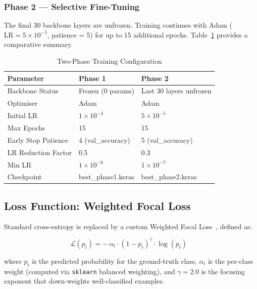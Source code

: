 \documentclass[12pt, a4paper, onecolumn]{IEEEtran}
\begin{document}
\subsubsection{Phase 2 --- Selective Fine-Tuning}

The final 30 backbone layers are unfrozen. Training continues with Adam ($\text{LR} = 5\times10^{-5}$,
patience = 5) for up to 15 additional epochs. Table~\ref{tab:phases} provides a comparative summary.

\begin{table}[H]
  \centering
  \caption{Two-Phase Training Configuration}
  \label{tab:phases}
  \begin{tabularx}{\linewidth}{lXX}
    \toprule
    \textbf{Parameter}      & \textbf{Phase 1} & \textbf{Phase 2} \\
    \midrule
    Backbone Status         & Frozen (0 params)     & Last 30 layers unfrozen \\
    Optimiser               & Adam                  & Adam \\
    Initial LR              & $1\times10^{-3}$      & $5\times10^{-5}$ \\
    Max Epochs              & 15                    & 15 \\
    Early Stop Patience     & 4 (val\_accuracy)     & 5 (val\_accuracy) \\
    LR Reduction Factor     & 0.5                   & 0.3 \\
    Min LR                  & $1\times10^{-6}$      & $1\times10^{-7}$ \\
    Checkpoint              & best\_phase1.keras    & best\_phase2.keras \\
    \bottomrule
  \end{tabularx}
\end{table}

\subsection{Loss Function: Weighted Focal Loss}

Standard cross-entropy is replaced by a custom Weighted Focal Loss~\cite{lin2017}, defined as:

\begin{equation}
  \mathcal{L}(p_t) = -\,\alpha_t \cdot (1 - p_t)^{\gamma} \cdot \log(p_t)
  \label{eq:focalloss}
\end{equation}

where $p_t$ is the predicted probability for the ground-truth class, $\alpha_t$ is the per-class weight
(computed via \texttt{sklearn} balanced weighting), and $\gamma = 2.0$ is the focusing exponent that
down-weights well-classified examples.
\end{document}
